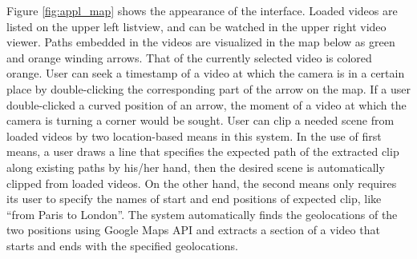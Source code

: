 Figure \ref{fig:appl_map} shows the appearance of the interface.
Loaded videos are listed on the upper left listview, and can be watched in the upper right video viewer.
Paths embedded in the videos are visualized in the map below as green and orange winding arrows. That of the currently selected video is colored orange.
User can seek a timestamp of a video at which the camera is in a certain place by double-clicking the corresponding part of the arrow on the map.
If a user double-clicked a curved position of an arrow, the moment of a video at which the camera is turning a corner would be sought.
User can clip a needed scene from loaded videos by two location-based means in this system.
In the use of first means, a user draws a line that specifies the expected path of the extracted clip along existing paths by his/her hand, then the desired scene is automatically clipped from loaded videos.
On the other hand, the second means only requires its user to specify the names of start and end positions of expected clip, like ``from Paris to London''.
The system automatically finds the geolocations of the two positions using Google Maps API \cite{googlemapsapi} and extracts a section of a video that starts and ends with the specified geolocations.
